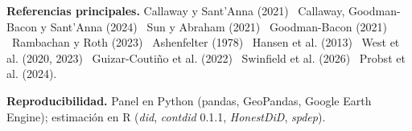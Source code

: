 \documentclass[final,t]{beamer}
\begin{document}
\begin{frame}[t]{}
\colorbox{tinta}{%
\begin{minipage}[t]{\dimexpr\paperwidth-2.4cm\relax}
\vspace{0.7cm}
\hspace{0.8cm}%
\begin{minipage}[t]{0.63\linewidth}
  {\color{papel!65}\small\textbf{\color{papel}Referencias principales.}
  Callaway y Sant'Anna (2021) \textbullet\ Callaway, Goodman-Bacon y Sant'Anna (2024)
  \textbullet\ Sun y Abraham (2021) \textbullet\ Goodman-Bacon (2021)
  \textbullet\ Rambachan y Roth (2023) \textbullet\ Ashenfelter (1978) \textbullet\ Hansen et al. (2013)
  \textbullet\ West et al. (2020, 2023) \textbullet\ Guizar-Coutiño et al. (2022)
  \textbullet\ Swinfield et al. (2026) \textbullet\ Probst et al. (2024).}
\end{minipage}\hfill
\begin{minipage}[t]{0.32\linewidth}
  {\color{papel!65}\small\textbf{\color{papel}Reproducibilidad.}
  Panel en Python (pandas, GeoPandas, Google Earth Engine); estimación en R
  (\textit{did}, \textit{contdid} 0.1.1, \textit{HonestDiD}, \textit{spdep}).}
\end{minipage}
\hspace{0.8cm}
\vspace{0.7cm}
\end{minipage}}

\end{frame}
\end{document}
